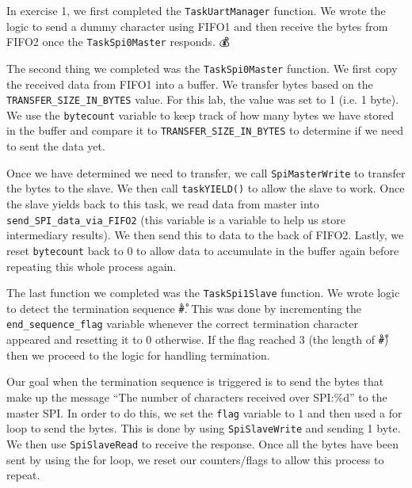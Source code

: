 \documentclass[11pt, letterpaper, titlepage]{article}
\begin{document}
In exercise 1, we first completed the \texttt{TaskUartManager} function. We wrote the logic to send a dummy character using FIFO1 and then receive the bytes from FIFO2 once the \texttt{TaskSpi0Master} responds. 💰

The second thing we completed was the \texttt{TaskSpi0Master} function. We first copy the received data from FIFO1 into a buffer. We transfer bytes based on the \texttt{TRANSFER_SIZE_IN_BYTES} value. For this lab, the value was set to 1 (i.e. 1 byte). We use the \texttt{bytecount} variable to keep track of how many bytes we have stored in the buffer and compare it to \texttt{TRANSFER_SIZE_IN_BYTES} to determine if we need to sent the data yet.

Once we have determined we need to transfer, we call \texttt{SpiMasterWrite} to transfer the bytes to the slave. We then call \texttt{taskYIELD()} to allow the slave to work. Once the slave yields back to this task, we read data from master into \texttt{send_SPI_data_via_FIFO2} (this variable is a variable to help us store intermediary results). We then send this to data to the back of FIFO2. Lastly, we reset \texttt{bytecount} back to 0 to allow data to accumulate in the buffer again before repeating this whole process again.

The last function we completed was the \texttt{TaskSpi1Slave} function. We wrote logic to detect the termination sequence \texttt{\r#\r}. This was done by incrementing the \texttt{end_sequence_flag} variable whenever the correct termination character appeared and resetting it to 0 otherwise. If the flag reached 3 (the length of \texttt{\r#\r}) then we proceed to the logic for handling termination.

Our goal when the termination sequence is triggered is to send the bytes that make up the message ``The number of characters received over SPI:\%d'' to the master SPI. In order to do this, we set the \texttt{flag} variable to 1 and then used a for loop to send the bytes. This is done by using \texttt{SpiSlaveWrite} and sending 1 byte. We then use \texttt{SpiSlaveRead} to receive the response. Once all the bytes have been sent by using the for loop, we reset our counters/flags to allow this process to repeat.
\end{document}
